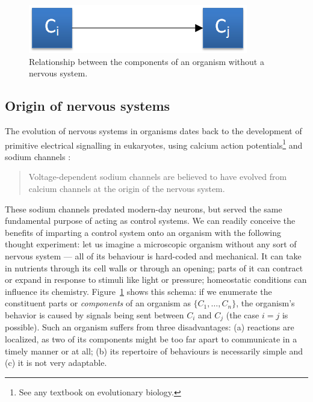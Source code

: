 \begin{figure}[!h]
	\centering
	\includegraphics{figs/noNervousSystem.png}
	\caption{Relationship between the components of an organism without a nervous system.}
	\label{fig:noNervousSystem}
\end{figure}
\subsection{Origin of nervous systems} The evolution of nervous systems in organisms dates back to the development of primitive electrical signalling in eukaryotes, using calcium action potentials\footnote{See any textbook on evolutionary biology.} and sodium channels \cite{Liebeskind31052011}:

\begin{quotation}
	Voltage-dependent sodium channels are believed to have evolved from calcium channels at the origin of the nervous system.
\end{quotation}

These sodium channels predated modern-day neurons, but served the same fundamental purpose of acting as control systems. We can readily conceive the benefits of imparting a control system onto an organism with the following thought experiment: let us imagine a microscopic organism without any sort of nervous system --- all of its behaviour is hard-coded and mechanical. It can take in nutrients through its cell walls or through an opening; parts of it can contract or expand in response to stimuli like light or pressure; homeostatic conditions can influence its chemistry. Figure~\ref{fig:noNervousSystem} shows this schema: if we enumerate the constituent parts or {\em components} of an organism as $\{C_1,\dots,C_n\}$, the organism's behavior is caused by signals being sent between $C_i$ and $C_j$ (the case $i=j$ is possible). Such an organism suffers from three disadvantages: (a) reactions are localized, as two of its components might be too far apart to communicate in a timely manner or at all; (b) its repertoire of behaviours is necessarily simple and (c) it is not very adaptable.


